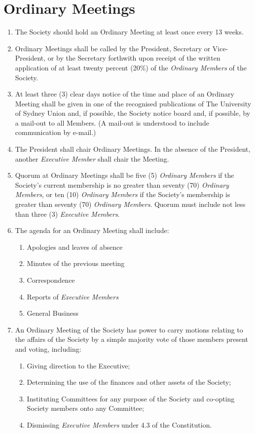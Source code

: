 \documentclass[11pt]{article}
\begin{document}
\section{Ordinary Meetings}
\begin{enumerate}[\thesection .1]
    \item The Society should hold an Ordinary Meeting at least once every 13 weeks.
    \item Ordinary Meetings shall be called by the President, Secretary or Vice-President, or by the Secretary forthwith upon receipt of the written application of at least twenty percent (20\%) of the \textit{Ordinary Members} of the Society.
    \item At least three (3) clear days notice of the time and place of an Ordinary Meeting shall be given in one of the recognised publications of The University of Sydney Union and, if possible, the Society notice board and, if possible, by a mail-out to all Members. (A mail-out is understood to include communication by e-mail.)
    \item The President shall chair Ordinary Meetings. In the absence of the President, another \textit{Executive Member} shall chair the Meeting.
    \item Quorum at Ordinary Meetings shall be five (5) \textit{Ordinary Members} if the Society’s current membership is no greater than seventy (70) \textit{Ordinary Members}, or ten (10) \textit{Ordinary Members} if the Society’s membership is greater than seventy (70) \textit{Ordinary Members}. Quorum must include not less than three (3) \textit{Executive Members}.
    \item The agenda for an Ordinary Meeting shall include:
    \begin{enumerate}[\hspace{5mm}1.]
        \item Apologies and leaves of absence
        \item Minutes of the previous meeting
        \item Correspondence
        \item Reports of \textit{Executive Members}
        \item General Business
    \end{enumerate}
    
    \item An Ordinary Meeting of the Society has power to carry motions relating to the affairs of the Society by a simple majority vote of those members present and voting, including:
    \begin{enumerate}
        \item Giving direction to the Executive;
        \item Determining the use of the finances and other assets of the Society;
        \item Instituting Committees for any purpose of the Society and co-opting Society members onto any Committee;
        \item Dismissing \textit{Executive Members} under 4.3 of the Constitution.
    \end{enumerate}
\end{enumerate}
\end{document}
